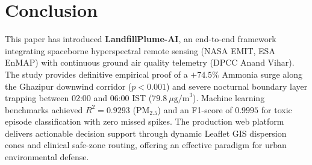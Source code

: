 \documentclass[conference]{IEEEtran}
\begin{document}
\section{Conclusion}
This paper has introduced \textbf{LandfillPlume-AI}, an end-to-end framework integrating spaceborne hyperspectral remote sensing (NASA EMIT, ESA EnMAP) with continuous ground air quality telemetry (DPCC Anand Vihar). The study provides definitive empirical proof of a $+74.5\%$ Ammonia surge along the Ghazipur downwind corridor ($p < 0.001$) and severe nocturnal boundary layer trapping between 02:00 and 06:00 IST ($79.8\ \mu\text{g/m}^3$). Machine learning benchmarks achieved $R^2 = 0.9293$ ($\text{PM}_{2.5}$) and an F1-score of $0.9995$ for toxic episode classification with zero missed spikes. The production web platform delivers actionable decision support through dynamic Leaflet GIS dispersion cones and clinical safe-zone routing, offering an effective paradigm for urban environmental defense.
\end{document}
